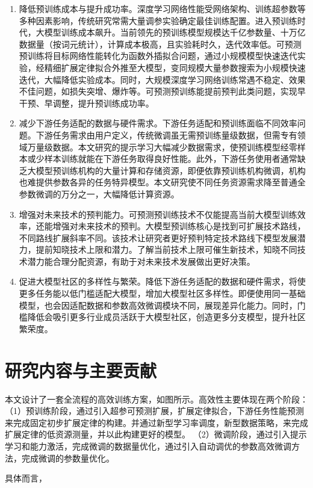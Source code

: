 \begin{enumerate}
  \item 降低预训练成本与提升成功率。深度学习网络性能受网络架构、训练超参数等多种因素影响，传统研究常需大量调参实验确定最佳训练配置。进入预训练时代，大模型训练成本飙升。当前领先的预训练模型规模达千亿参数量、十万亿数据量（按词元统计），计算成本极高，且实验耗时久，迭代效率低。可预测预训练将目标网络性能转化为函数外插拟合问题，通过小规模模型快速迭代实验，经精细扩展定律拟合外推至大模型，变同规模大量参数搜索为小规模快速迭代，大幅降低实验成本。同时，大规模深度学习网络训练常遇不稳定、效果不佳问题，如损失突增、爆炸等。可预测预训练能提前预判此类问题，实现早干预、早调整，提升预训练成功率。
  \item 减少下游任务适配的数据与硬件需求。下游任务适配和预训练面临不同效率问题。下游任务需求由用户定义，传统微调虽无需预训练量级数据，但需专有领域万量级数据。本文研究的提示学习大幅减少数据需求，使预训练模型经零样本或少样本训练就能在下游任务取得良好性能。此外，下游任务使用者通常缺乏大模型预训练机构的大量计算和存储资源，即便依靠预训练机构微调，机构也难提供参数各异的任务特异模型。本文研究使不同任务资源需求降至普通全参数微调的万分之一，大幅降低计算资源。
  \item 增强对未来技术的预判能力。可预测预训练技术不仅能提高当前大模型训练效率，还能增强对未来技术的预判。大模型预训练核心是找到可扩展技术路线，不同路线扩展斜率不同。该技术让研究者更好预判特定技术路线下模型发展潜力，提前知晓技术上限和潜力。了解当前技术上限可催生新技术，知晓不同技术潜力能合理分配资源，有助于对未来技术发展做出更好决策。
  \item 促进大模型社区的多样性与繁荣。降低下游任务适配的数据和硬件需求，将使更多任务能以低门槛适配大模型，增加大模型社区多样性。即便使用同一基础模型，也会因适配数据和参数高效微调模块不同，展现差异化能力。同时，门槛降低会吸引更多行业成员活跃于大模型社区，创造更多分支模型，提升社区繁荣度。
\end{enumerate}


\section{研究内容与主要贡献}
本文设计了一套全流程的高效训练方案，如图所示。高效性主要体现在两个阶段：（1）预训练阶段，通过引入超参可预测扩展，扩展定律拟合，下游任务性能预测来完成固定初步扩展定律的构建。并通过新型学习率调度，新型数据策略，来完成扩展定律的低资源测量，并以此构建更好的模型。 （2）微调阶段，通过引入提示学习和能力激活，完成微调的数据量优化，通过引入自动调优的参数高效微调方法，完成微调的参数量优化。

具体而言，

